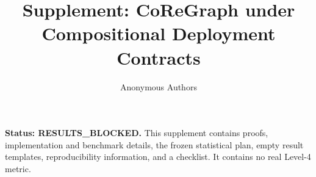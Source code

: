 \documentclass{article}
\title{Supplement: CoReGraph under Compositional Deployment Contracts}
\author{Anonymous Authors}
\begin{document}
\maketitle
\noindent\textbf{Status: RESULTS\_BLOCKED.} This supplement contains proofs, implementation and benchmark details, the frozen statistical plan, empty result templates, reproducibility information, and a checklist. It contains no real Level-4 metric.









\end{document}
